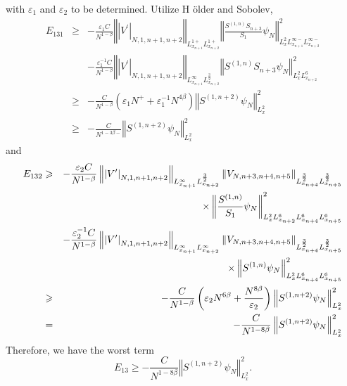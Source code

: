 \documentclass[12pt,letterpaper,leqno]{amsart}
\theoremstyle{plain}
\numberwithin{equation}{section}
\numberwithin{theorem}{section}
\numberwithin{proposition}{section}
\numberwithin{lemma}{section}
\numberwithin{corollary}{section}
\begin{document}
with $\varepsilon _{1}$ and $\varepsilon _{2}$ to be determined. Utilize H%
\"{o}lder and Sobolev,%
\begin{eqnarray*}
E_{131} &\geqslant &-\frac{\varepsilon _{1}C}{N^{1-\beta }}\left\Vert
\left\vert V^{\prime }\right\vert _{N,1,n+1,n+2}\right\Vert
_{L_{x_{n+1}}^{1+}L_{x_{n+2}}^{1+}}\left\Vert \frac{S^{(1,n)}S_{n+3}}{S_{1}}%
\psi _{N}\right\Vert _{L_{x}^{2}L_{x_{n+1}}^{\infty -}L_{x_{n+2}}^{\infty
-}}^{2} \\
&&-\frac{\varepsilon _{1}^{-1}C}{N^{1-\beta }}\left\Vert \left\vert
V^{\prime }\right\vert _{N,1,n+1,n+2}\right\Vert _{L_{x_{n+1}}^{\infty
}L_{x_{n+2}}^{\frac{3}{2}}}\left\Vert S^{(1,n)}S_{n+3}\psi _{N}\right\Vert
_{L_{x}^{2}L_{x_{n+2}}^{6}}^{2} \\
&\geqslant &-\frac{C}{N^{1-\beta }}\left( \varepsilon _{1}N^{+}+\varepsilon
_{1}^{-1}N^{4\beta }\right) \left\Vert S^{(1,n+2)}\psi _{N}\right\Vert
_{L_{x}^{2}}^{2} \\
&\geqslant &-\frac{C}{N^{1-3\beta -}}\left\Vert S^{(1,n+2)}\psi
_{N}\right\Vert _{L_{x}^{2}}^{2}
\end{eqnarray*}%
and%
\begin{eqnarray*}
E_{132} &\geqslant &-\frac{\varepsilon _{2}C}{N^{1-\beta }}\left\Vert
\left\vert V^{\prime }\right\vert _{N,1,n+1,n+2}\right\Vert
_{L_{x_{n+1}}^{\infty }L_{x_{n+2}}^{\frac{3}{2}}}\left\Vert
V_{N,n+3,n+4,n+5}\right\Vert _{L_{x_{n+4}}^{\frac{3}{2}}L_{x_{n+5}}^{\frac{3%
}{2}}} \\
&&\times \left\Vert \frac{S^{(1,n)}}{S_{1}}\psi _{N}\right\Vert
_{L_{x}^{2}L_{x_{n+2}}^{6}L_{x_{n+4}}^{6}L_{x_{n+5}}^{6}}^{2} \\
&&-\frac{\varepsilon _{2}^{-1}C}{N^{1-\beta }}\left\Vert \left\vert
V^{\prime }\right\vert _{N,1,n+1,n+2}\right\Vert _{L_{x_{n+1}}^{\infty
}L_{x_{n+2}}^{\infty }}\left\Vert V_{N,n+3,n+4,n+5}\right\Vert
_{L_{x_{n+4}}^{\frac{3}{2}}L_{x_{n+5}}^{\frac{3}{2}}} \\
&&\times \left\Vert S^{(1,n)}\psi _{N}\right\Vert
_{L_{x}^{2}L_{x_{n+4}}^{6}L_{x_{n+5}}^{6}}^{2} \\
&\geqslant &-\frac{C}{N^{1-\beta }}\left( \varepsilon _{2}N^{6\beta }+\frac{%
N^{8\beta }}{\varepsilon _{2}}\right) \left\Vert S^{(1,n+2)}\psi
_{N}\right\Vert _{L_{x}^{2}}^{2} \\
&=&-\frac{C}{N^{1-8\beta }}\left\Vert S^{(1,n+2)}\psi _{N}\right\Vert
_{L_{x}^{2}}^{2}
\end{eqnarray*}%
Therefore, we have the worst term%
\begin{equation}
E_{13}\geqslant -\frac{C}{N^{1-8\beta }}\left\Vert S^{(1,n+2)}\psi
_{N}\right\Vert _{L_{x}^{2}}^{2}.  \label{estimate:E13}
\end{equation}
\end{document}
